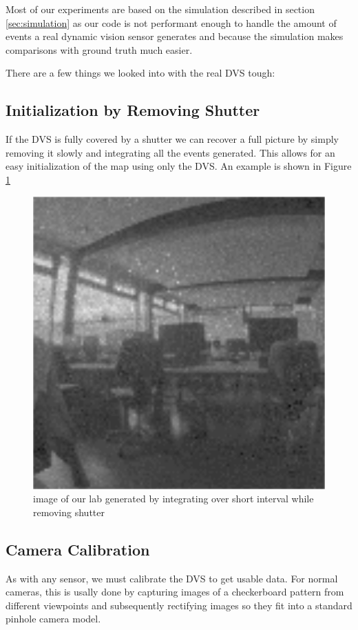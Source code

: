 Most of our experiments are based on the simulation described in section
\ref{sec:simulation} as our code is not performant enough to handle the amount
of events a real dynamic vision sensor generates and because the simulation
makes comparisons with ground truth much easier.

There are a few things we looked into with the real DVS tough:

\subsection{Initialization by Removing Shutter}
\label{sec:shutter_removal}
If the DVS is fully covered by a shutter we can recover a full picture by
simply removing it slowly and integrating all the events generated. This allows
for an easy initialization of the map using only the DVS. An example is shown in Figure \ref{fig:shutter_integration}

\begin{figure}
\includegraphics[width=\linewidth]{images/PCLab_integrated.png}
\caption{image of our lab generated by integrating over short interval while removing shutter}
\label{fig:shutter_integration}
\end{figure}


\subsection{Camera Calibration}
\label{sec:camera_calibration}
As with any sensor, we must calibrate the DVS to get usable data. For normal
cameras, this is usally done by capturing images of a checkerboard pattern from
different viewpoints and subsequently rectifying images so they fit into a
standard pinhole camera model.

